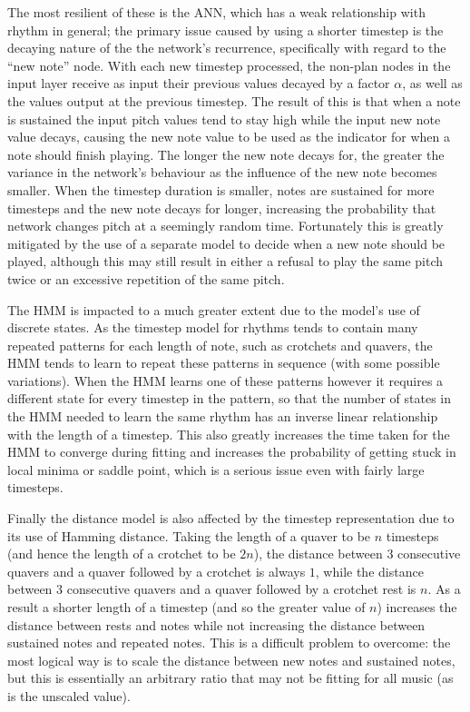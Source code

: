 \documentclass[ author={Stephen Livermore-Tozer},
				supervisor={Dr. Peter Flach},
				degree={MEng},
				title={Algorithmic Co-composition Using Machine Learning},
				subtitle={},
				type={research},
				year={2016} ]{dissertation}
\begin{document}
	The most resilient of these is the ANN, which has a weak relationship with rhythm in general; the primary issue caused by using a shorter timestep is the decaying nature of the the network's recurrence, specifically with regard to the ``new note'' node. With each new timestep processed, the non-plan nodes in the input layer receive as input their previous values decayed by a factor $\alpha$, as well as the values output at the previous timestep. The result of this is that when a note is sustained the input pitch values tend to stay high while the input new note value decays, causing the new note value to be used as the indicator for when a note should finish playing. The longer the new note decays for, the greater the variance in the network's behaviour as the influence of the new note becomes smaller. When the timestep duration is smaller, notes are sustained for more timesteps and the new note decays for longer, increasing the probability that network changes pitch at a seemingly random time. Fortunately this is greatly mitigated by the use of a separate model to decide when a new note should be played, although this may still result in either a refusal to play the same pitch twice or an excessive repetition of the same pitch.
	
	The HMM is impacted to a much greater extent due to the model's use of discrete states. As the timestep model for rhythms tends to contain many repeated patterns for each length of note, such as crotchets and quavers, the HMM tends to learn to repeat these patterns in sequence (with some possible variations). When the HMM learns one of these patterns however it requires a different state for every timestep in the pattern, so that the number of states in the HMM needed to learn the same rhythm has an inverse linear relationship with the length of a timestep. This also greatly increases the time taken for the HMM to converge during fitting and increases the probability of getting stuck in local minima or saddle point, which is a serious issue even with fairly large timesteps. 
	
	Finally the distance model is also affected by the timestep representation due to its use of Hamming distance. Taking the length of a quaver to be $n$ timesteps (and hence the length of a crotchet to be $2n$), the distance between 3 consecutive quavers and a quaver followed by a crotchet is always $1$, while the distance between 3 consecutive quavers and a quaver followed by a crotchet rest is $n$. As a result a shorter length of a timestep (and so the greater value of $n$) increases the distance between rests and notes while not increasing the distance between sustained notes and repeated notes. This is a difficult problem to overcome: the most logical way is to scale the distance between new notes and sustained notes, but this is essentially an arbitrary ratio that may not be fitting for all music (as is the unscaled value). 
	
\end{document}

